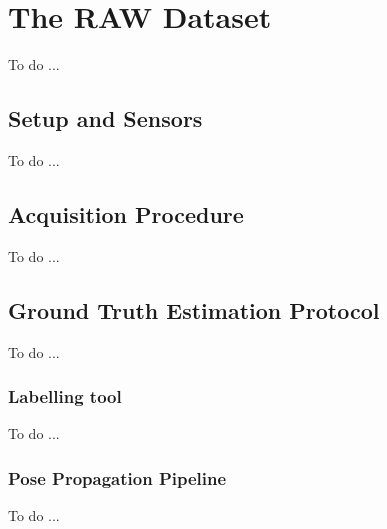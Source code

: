 \chapter{The RAW Dataset}\label{ch:benchmarks_and_metrics}
To do ...

\section{Setup and Sensors}\label{sec:raw_setup_and_sensors}
To do ...

\section{Acquisition Procedure}\label{sec:raw_acquisition_procedure}
To do ...

\section{Ground Truth Estimation Protocol}\label{sec:ground_truth_estim}
To do ...

\subsection{Labelling tool}\label{subsec:raw_labeltool}
To do ...

\subsection{Pose Propagation Pipeline}\label{subsec:pose_propagation}
To do ...